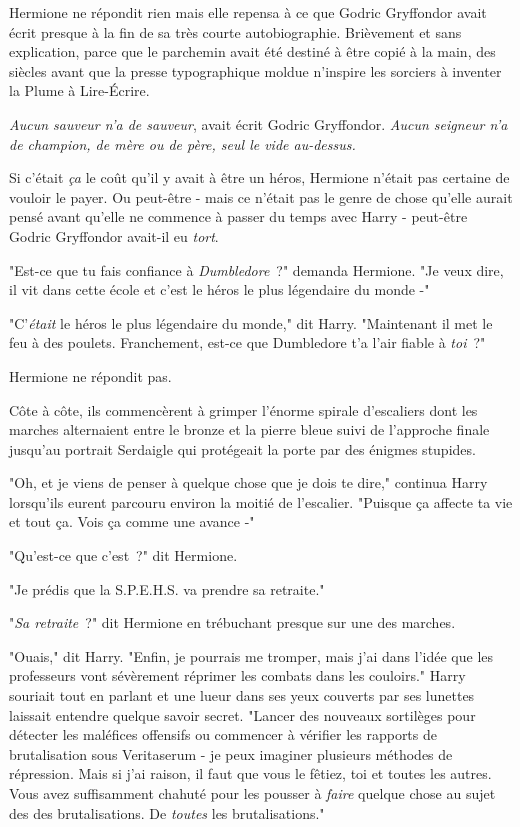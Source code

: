 Hermione ne répondit rien mais elle repensa à ce que Godric Gryffondor avait écrit presque à la fin de sa très courte autobiographie. Brièvement et sans explication, parce que le parchemin avait été destiné à être copié à la main, des siècles avant que la presse typographique moldue n'inspire les sorciers à inventer la Plume à Lire-Écrire.

\emph{Aucun sauveur n'a de sauveur}, avait écrit Godric Gryffondor. \emph{Aucun seigneur n'a de champion, de mère ou de père, seul le vide au-dessus.}

Si c'était \emph{ça} le coût qu'il y avait à être un héros, Hermione n'était pas certaine de vouloir le payer. Ou peut-être - mais ce n'était pas le genre de chose qu'elle aurait pensé avant qu'elle ne commence à passer du temps avec Harry - peut-être Godric Gryffondor avait-il eu \emph{tort}.

"Est-ce que tu fais confiance à \emph{Dumbledore}~?" demanda Hermione. "Je veux dire, il vit dans cette école et c'est le héros le plus légendaire du monde -"

"C'\emph{était} le héros le plus légendaire du monde," dit Harry. "Maintenant il met le feu à des poulets. Franchement, est-ce que Dumbledore t'a l'air fiable à \emph{toi}~?"

Hermione ne répondit pas.

Côte à côte, ils commencèrent à grimper l'énorme spirale d'escaliers dont les marches alternaient entre le bronze et la pierre bleue suivi de l'approche finale jusqu'au portrait Serdaigle qui protégeait la porte par des énigmes stupides.

"Oh, et je viens de penser à quelque chose que je dois te dire," continua Harry lorsqu'ils eurent parcouru environ la moitié de l'escalier. "Puisque ça affecte ta vie et tout ça. Vois ça comme une avance -"

"Qu'est-ce que c'est~?" dit Hermione.

"Je prédis que la S.P.E.H.S. va prendre sa retraite."

"\emph{Sa retraite}~?" dit Hermione en trébuchant presque sur une des marches.

"Ouais," dit Harry. "Enfin, je pourrais me tromper, mais j'ai dans l'idée que les professeurs vont sévèrement réprimer les combats dans les couloirs." Harry souriait tout en parlant et une lueur dans ses yeux couverts par ses lunettes laissait entendre quelque savoir secret. "Lancer des nouveaux sortilèges pour détecter les maléfices offensifs ou commencer à vérifier les rapports de brutalisation sous Veritaserum - je peux imaginer plusieurs méthodes de répression. Mais si j'ai raison, il faut que vous le fêtiez, toi et toutes les autres. Vous avez suffisamment chahuté pour les pousser à \emph{faire} quelque chose au sujet des des brutalisations. De \emph{toutes} les brutalisations."

